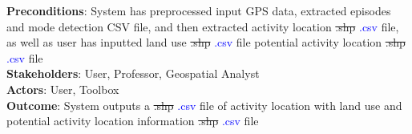 \documentclass[12pt, titlepage]{article}
\begin{document}
\begin{itemize}
{        \textbf{Preconditions}: System has preprocessed input GPS data, extracted episodes and mode detection CSV file, and then extracted activity location \sout{.shp} \textcolor{blue}{.csv} file, as well as user has inputted land use \sout{.shp} \textcolor{blue}{.csv} file potential activity location \sout{.shp} \textcolor{blue}{.csv} file \\
        \textbf{Stakeholders}: User, Professor, Geospatial Analyst\\
        \textbf{Actors}: User, Toolbox\\
        \textbf{Outcome}: System outputs a \sout{.shp} \textcolor{blue}{.csv} file of activity location with land use and potential activity location information \sout{.shp} \textcolor{blue}{.csv} file\\}
\end{itemize}
\end{document}
